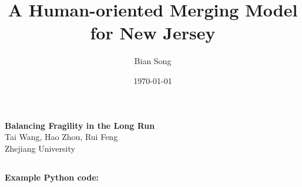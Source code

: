 \documentclass[notitlepage]{mcmthesis}
\title{
    A Human-oriented Merging Model for New Jersey}
\author{Bian Song}
\date{\today}
\theoremstyle{definition}
\begin{document}
    
    
    
    
    \maketitle
    
    
    \begin{center}
        \textbf{\LARGE{Balancing Fragility in the Long Run}}
        \\
        \Large{Tai Wang, Hao Zhou, Rui Feng \\ Zhejiang University}
    \end{center}
    
    \setcounter{page}{1}













\newpage
\begin{appendices}
\section{}
\noindent
\textbf{\textcolor[rgb]{0.98,0.00,0.00}{Example Python code: }}

\end{appendices}
\end{document}
